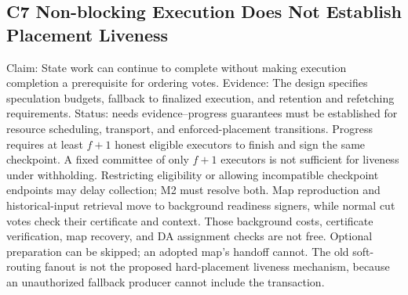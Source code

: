 \documentclass[11pt]{article}
\begin{document}

\subsection*{C7 Non-blocking Execution Does Not Establish Placement Liveness}

Claim: State work can continue to complete without making execution completion a prerequisite for ordering votes. Evidence: The design specifies speculation budgets, fallback to finalized execution, and retention and refetching requirements. Status: needs evidence--progress guarantees must be established for resource scheduling, transport, and enforced-placement transitions. Progress requires at least \(f+1\) honest eligible executors to finish and sign the same checkpoint. A fixed committee of only \(f+1\) executors is not sufficient for liveness under withholding. Restricting eligibility or allowing incompatible checkpoint endpoints may delay collection; M2 must resolve both. Map reproduction and historical-input retrieval move to background readiness signers, while normal cut votes check their certificate and context. Those background costs, certificate verification, map recovery, and DA assignment checks are not free. Optional preparation can be skipped; an adopted map's handoff cannot. The old soft-routing fanout is not the proposed hard-placement liveness mechanism, because an unauthorized fallback producer cannot include the transaction.

\end{document}
